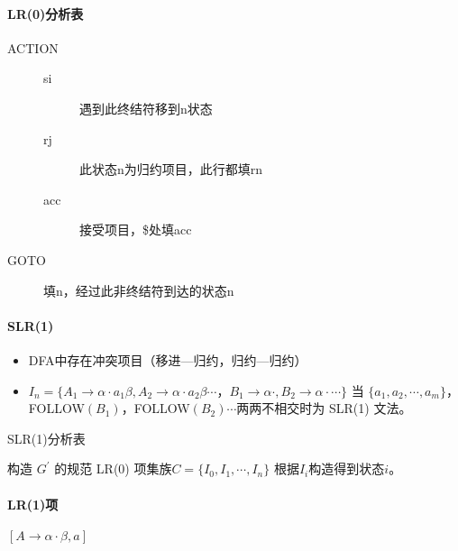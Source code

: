\documentclass[10pt]{article}
\begin{document}
\begin{multicols}{3}
		\paragraph{LR(0)分析表}
		\begin{description}
			\item[ACTION] 
			
			\begin{description}
				\item[si] 遇到此终结符移到n状态
				\item[rj] 此状态n为归约项目，此行都填rn
				\item[acc] 接受项目，\$处填acc
			\end{description}
			\item[GOTO] 填n，经过此非终结符到达的状态n
		\end{description}
	
		\paragraph{SLR(1)}
		\begin{itemize}
			\item DFA中存在冲突项目（移进---归约，归约---归约）
			\item $I_n=\{A_1\rightarrow \alpha\cdot a_1\beta, A_2\rightarrow \alpha\cdot a_2\beta\cdots$，$B_1\rightarrow\alpha\cdot,B_2\rightarrow\alpha\cdot\cdots\}$ 当 $\{a_1,a_2,\cdots,a_m\}$，FOLLOW$(B_1)$，FOLLOW$(B_2)\cdots$两两不相交时为 SLR(1) 文法。
		\end{itemize}
		
		\begin{algorithm}[H]
			\caption{SLR(1)分析表}
			构造 $G^\prime$ 的规范 LR(0) 项集族$C=\{I_0,I_1,\cdots,I_n\}$\;
			根据$I_i$构造得到状态$i$。
		\end{algorithm}

		\paragraph{LR(1)项} $[A\rightarrow \alpha\cdot\beta,a]$
		

\end{multicols}
\end{document}

